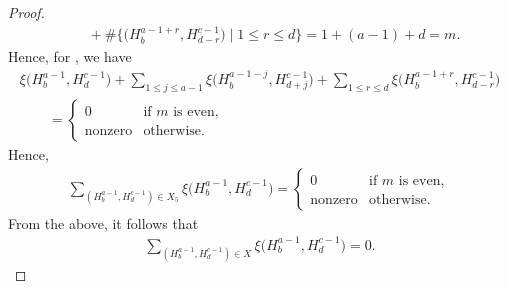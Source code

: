 \documentclass[10pt,a4paper]{amsart}
\numberwithin{equation}{section}
\begin{document}
\begin{proof}
\begin{gather*}
\qquad{}+\#\bigl\{\bigl(H^{a-1+r}_{b},H^{c-1}_{d-r}\bigr)\mid 1\leq r\leq d \bigr\}=1+(a-1)+d=m.
\end{gather*}
Hence, for , we have
\begin{gather*}
\xi\bigl(H^{a-1}_{b},H^{c-1}_{d}\bigr)+\sum_{1\leq j \leq a-1}\xi\bigl(H^{a-1-j}_{b},H^{c-1}_{d+j}\bigr)+\sum_{1\leq r \leq d}\xi\bigl(H^{a-1+r}_{b},H^{c-1}_{d-r}\bigr)\\
\qquad{}=\begin{cases}
0 & \text{if $m$ is even},\\
\text{nonzero} & \text{otherwise}.
\end{cases}
\end{gather*}
Hence,
\begin{gather*}
\sum_{(H^{a-1}_{b},H^{c-1}_{d})\in X_5}\xi\bigl(H^{a-1}_{b},H^{c-1}_{d}\bigr)=
\begin{cases}
0 & \text{if $m$ is even},\\
\text{nonzero} & \text{otherwise}.
\end{cases}
\end{gather*}
From the above, it follows that
\begin{align*}
\sum_{(H^{a-1}_{b},H^{c-1}_{d})\in X}\xi\bigl(H^{a-1}_{b},H^{c-1}_{d}\bigr)=0.
\tag*{\qed}
\end{align*}
\renewcommand{\qed}{}
\end{proof}
\end{document}
